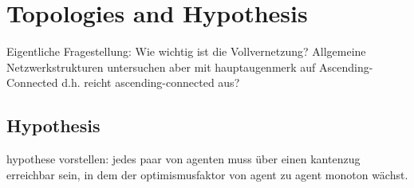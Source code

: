 \documentclass[Bachelorarbeit.tex]{subfiles}
\begin{document}
\chapter{Topologies and Hypothesis}
Eigentliche Fragestellung: Wie wichtig ist die Vollvernetzung?
	Allgemeine Netzwerkstrukturen untersuchen aber mit hauptaugenmerk auf Ascending-Connected d.h. reicht ascending-connected aus?


\section{Hypothesis}
hypothese vorstellen: jedes paar von agenten muss über einen kantenzug erreichbar sein, in dem der optimismusfaktor von agent zu agent monoton wächst.
\end{document}
